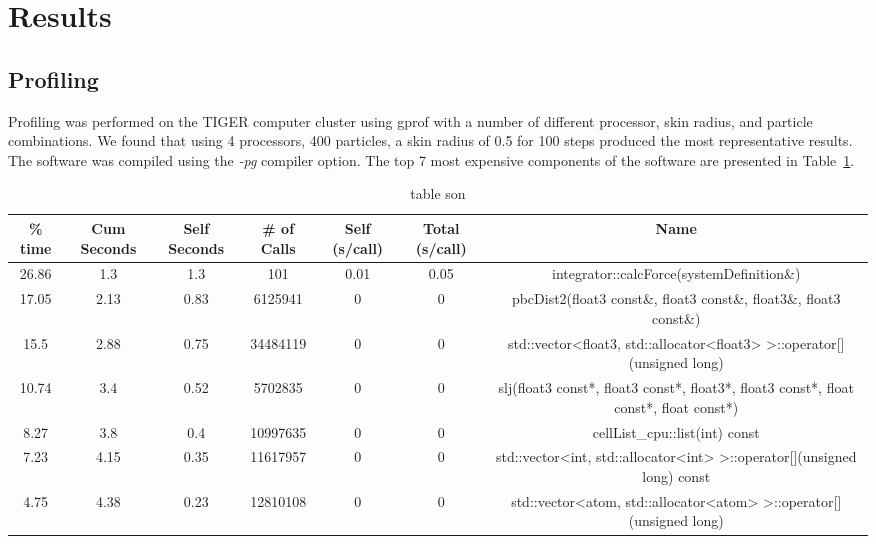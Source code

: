 \documentclass[12pt]{article}
\begin{document}
\section{Results}

\subsection{Profiling}

Profiling was performed on the TIGER computer cluster using gprof with a number of different processor, skin radius, and particle combinations. We found that using 4 processors, 400 particles, a skin radius of 0.5 for 100 steps produced the most representative results. The software was compiled using the \textit{-pg} compiler option. The top 7 most expensive components of the software are presented in Table~\ref{tab:profiling}.

\begin{table}[htbp]
  \centering
  \tiny
  \caption{table son}
    \begin{tabular}{ccccccc}
    \toprule
    \% time & Cum Seconds & Self Seconds & \# of Calls & Self (s/call) & Total (s/call) & Name \\
    \midrule
    26.86 & 1.3   & 1.3   & 101   & 0.01  & 0.05  & integrator::calcForce(systemDefinition\&) \\
    17.05 & 2.13  & 0.83  & 6125941 & 0     & 0     & pbcDist2(float3 const\&, float3 const\&, float3\&, float3 const\&) \\
    15.5  & 2.88  & 0.75  & 34484119 & 0     & 0     & std::vector<float3, std::allocator<float3> >::operator[](unsigned long) \\
    10.74 & 3.4   & 0.52  & 5702835 & 0     & 0     & slj(float3 const*, float3 const*, float3*, float3 const*, float const*, float const*) \\
    8.27  & 3.8   & 0.4   & 10997635 & 0     & 0     & cellList\_cpu::list(int) const \\
    7.23  & 4.15  & 0.35  & 11617957 & 0     & 0     & std::vector<int, std::allocator<int> >::operator[](unsigned long) const \\
    4.75  & 4.38  & 0.23  & 12810108 & 0     & 0     & std::vector<atom, std::allocator<atom> >::operator[](unsigned long) \\
    \bottomrule
    \end{tabular}%
  \label{tab:profiling}%
\end{table}%
\end{document}
